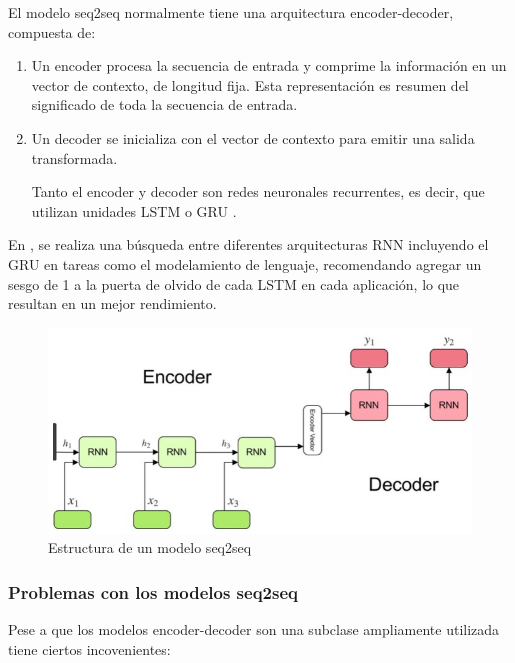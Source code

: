 \documentclass[conference]{IEEEtran}
\begin{document}
\vspace{0.2cm}

El modelo seq2seq normalmente tiene una arquitectura encoder-decoder, compuesta de:

\begin{enumerate}
\item Un encoder procesa la secuencia de entrada y comprime la informaci\'on en un vector de contexto, de  longitud fija. Esta representaci\'on es resumen del significado de toda la secuencia de entrada.
\item Un decoder se inicializa con el vector de contexto para emitir una salida transformada. 

Tanto el encoder y decoder son redes neuronales recurrentes, es decir, que utilizan unidades LSTM \cite{b17, b18} o GRU \cite{b19}. 

\end{enumerate}

\vspace{0.2cm}

En \cite{b20}, se realiza una b\'usqueda entre diferentes arquitecturas RNN incluyendo el GRU en tareas como el modelamiento de lenguaje, recomendando agregar un sesgo de 1 a la puerta de olvido de cada LSTM en cada aplicaci\'on, lo que resultan en un mejor rendimiento.

\begin{figure}[h]
	\centering
	\includegraphics[scale=.3]{imagenes/seq2seq.jpg}
	\caption{Estructura de un modelo seq2seq} 
\end{figure}

\subsubsection{Problemas con los modelos seq2seq}

Pese a que los  modelos encoder-decoder son una subclase ampliamente utilizada tiene ciertos incovenientes:
\end{document}
